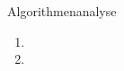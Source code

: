 \documentclass{article}
\begin{document}
\begin{exercise}{Algorithmenanalyse}
  \begin{enumerate}
    \item
    \item
  \end{enumerate}

  \begin{solution}

  \end{solution}
\end{exercise}
\end{document}
